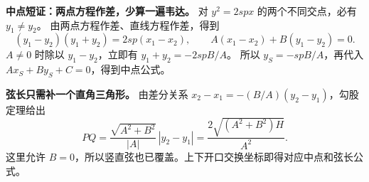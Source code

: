 \clearpage
\begin{proofbox}
\textbf{中点短证：两点方程作差，少算一遍韦达。}
对 $y^2=2spx$ 的两个不同交点，必有 $y_1\ne y_2$。
由两点方程作差、直线方程作差，得到
\[
 (y_1-y_2)(y_1+y_2)=2sp(x_1-x_2),\qquad
 A(x_1-x_2)+B(y_1-y_2)=0.
\]
$A\ne0$ 时除以 $y_1-y_2$，立即有 $y_1+y_2=-2spB/A$。
所以 $y_S=-spB/A$，再代入 $Ax_S+By_S+C=0$，得到中点公式。

\textbf{弦长只需补一个直角三角形。}
由差分关系 $x_2-x_1=-(B/A)(y_2-y_1)$，勾股定理给出
\[
 PQ=\frac{\sqrt{A^2+B^2}}{|A|}\,|y_2-y_1|
 =\frac{2\sqrt{(A^2+B^2)H}}{A^2}.
\]
这里允许 $B=0$，所以竖直弦也已覆盖。上下开口交换坐标即得对应中点和弦长公式。
\end{proofbox}
\clearpage
